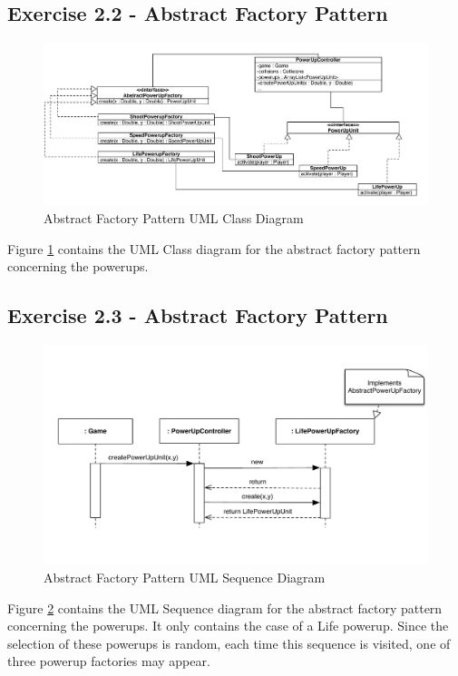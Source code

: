 \subsection{Exercise 2.2 - Abstract Factory Pattern}

\begin{figure}[ht!]
\centering
\includegraphics[width=15cm]{SI-UMLpowerupFactory.pdf}
\caption{Abstract Factory Pattern UML Class Diagram}
\label{fig:2-2factory}
\end{figure}

Figure \ref{fig:2-2factory} contains the UML Class diagram for the abstract factory pattern concerning the powerups.

\subsection{Exercise 2.3 - Abstract Factory Pattern}

\begin{figure}[ht!]
\centering
\includegraphics[width=15cm]{SI-Sequence-Factory.pdf}
\caption{Abstract Factory Pattern UML Sequence Diagram}
\label{fig:2-3factory}
\end{figure}

Figure \ref{fig:2-3factory} contains the UML Sequence diagram for the abstract factory pattern concerning the powerups. It only contains the case of a Life powerup. Since the selection of these powerups is random, each time this sequence is visited, one of three powerup factories may appear.